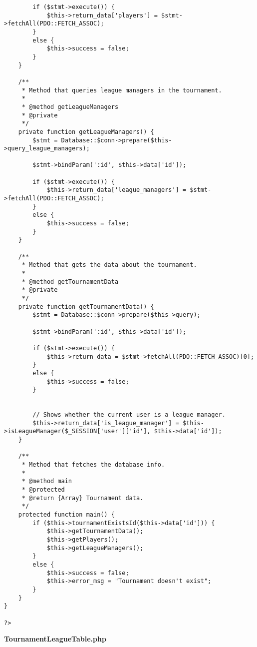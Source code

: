{\begin{lstlisting}
		if ($stmt->execute()) {
			$this->return_data['players'] = $stmt->fetchAll(PDO::FETCH_ASSOC);
		}
		else {
			$this->success = false;
		}
	}

	/**
	 * Method that queries league managers in the tournament.
	 *
	 * @method getLeagueManagers
	 * @private
	 */
	private function getLeagueManagers() {
		$stmt = Database::$conn->prepare($this->query_league_managers);

		$stmt->bindParam(':id', $this->data['id']);

		if ($stmt->execute()) {
			$this->return_data['league_managers'] = $stmt->fetchAll(PDO::FETCH_ASSOC);
		}
		else {
			$this->success = false;
		}
	}

	/**
	 * Method that gets the data about the tournament.
	 *
	 * @method getTournamentData
	 * @private
	 */
	private function getTournamentData() {
		$stmt = Database::$conn->prepare($this->query);

		$stmt->bindParam(':id', $this->data['id']);

		if ($stmt->execute()) {
			$this->return_data = $stmt->fetchAll(PDO::FETCH_ASSOC)[0];
		}
		else {
			$this->success = false;
		}


		// Shows whether the current user is a league manager.
		$this->return_data['is_league_manager'] = $this->isLeagueManager($_SESSION['user']['id'], $this->data['id']);
	}

	/**
	 * Method that fetches the database info.
	 *
	 * @method main
	 * @protected
	 * @return {Array} Tournament data.
	 */
	protected function main() {
		if ($this->tournamentExistsId($this->data['id'])) {
			$this->getTournamentData();
			$this->getPlayers();
			$this->getLeagueManagers();
		}
		else {
			$this->success = false;
			$this->error_msg = "Tournament doesn't exist";
		}
	}
}

?>\end{lstlisting}
}
\textbf{TournamentLeagueTable.php}

